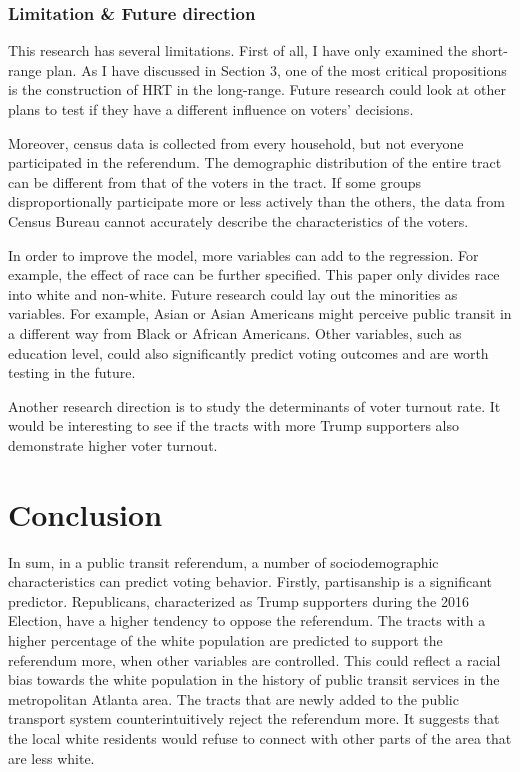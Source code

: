 \documentclass[
]{article}
\begin{document}
\hypertarget{limitation-future-direction}{%
\subsubsection{Limitation \& Future
direction}\label{limitation-future-direction}}

This research has several limitations. First of all, I have only
examined the short-range plan. As I have discussed in Section 3, one of
the most critical propositions is the construction of HRT in the
long-range. Future research could look at other plans to test if they
have a different influence on voters' decisions.

Moreover, census data is collected from every household, but not
everyone participated in the referendum. The demographic distribution of
the entire tract can be different from that of the voters in the tract.
If some groups disproportionally participate more or less actively than
the others, the data from Census Bureau cannot accurately describe the
characteristics of the voters.

In order to improve the model, more variables can add to the regression.
For example, the effect of race can be further specified. This paper
only divides race into white and non-white. Future research could lay
out the minorities as variables. For example, Asian or Asian Americans
might perceive public transit in a different way from Black or African
Americans. Other variables, such as education level, could also
significantly predict voting outcomes and are worth testing in the
future.

Another research direction is to study the determinants of voter turnout
rate. It would be interesting to see if the tracts with more Trump
supporters also demonstrate higher voter turnout.

\hypertarget{conclusion}{%
\section{Conclusion}\label{conclusion}}

In sum, in a public transit referendum, a number of sociodemographic
characteristics can predict voting behavior. Firstly, partisanship is a
significant predictor. Republicans, characterized as Trump supporters
during the 2016 Election, have a higher tendency to oppose the
referendum. The tracts with a higher percentage of the white population
are predicted to support the referendum more, when other variables are
controlled. This could reflect a racial bias towards the white
population in the history of public transit services in the metropolitan
Atlanta area. The tracts that are newly added to the public transport
system counterintuitively reject the referendum more. It suggests that
the local white residents would refuse to connect with other parts of
the area that are less white.
\end{document}
